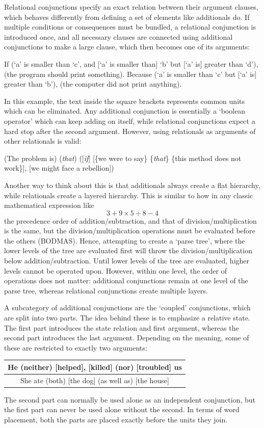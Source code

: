 Relational conjunctions specify an exact relation between their argument clauses, which behaves differently from defining a set of elements like additionals do. If multiple conditions or consequences must be bundled, a relational conjunction is introduced once, and all necessary clauses are connected using additional conjunctions to make a large clause, which then becomes one of its arguments:
\begin{example}
    If (`a' is smaller than `c', and [`a' is smaller than] `b' but [`a' is] greater than `d'), (the program should print something). Because (`a' is smaller than `c' but [`a' is] greater than `b'), (the computer did not print anything).
\end{example}
In this example, the text inside the square brackets represents common units which can be eliminated. Any additional conjunction is essentially a `boolean operator' which can keep adding on itself, while relational conjunctions expect a hard stop after the second argument. However, using relationals as arguments of other relationals is valid:
\begin{example}
    (The problem is) (\textit{that}) ([\textit{if}] [\{we were to say\} \{\textit{that}\} \{this method does not work\}], [we might face a rebellion])
\end{example}
Another way to think about this is that additionals always create a flat hierarchy, while relationals create a layered hierarchy. This is similar to how in any classic mathematical expression like
\begin{equation*}
    3+9\times5\div8-4
\end{equation*}
the precedence order of addition/subtraction, and that of division/multiplication is the same, but the division/multiplication operations must be evaluated before the others (BODMAS). Hence, attempting to create a `parse tree', where the lower levels of the tree are evaluated first will throw the division/multiplication below addition/subtraction. Until lower levels of the tree are evaluated, higher levels cannot be operated upon. However, within one level, the order of operations does not matter: additional conjunctions remain at one level of the parse tree, whereas relational conjunctions create multiple layers.

A subcategory of additional conjunctions are the `coupled' conjunctions, which are split into two parts. The idea behind these is to emphasize a relative state. The first part introduces the state relation and first argument, whereas the second part introduces the last argument. Depending on the meaning, some of these are restricted to exactly two arguments:
\begin{example}
    \begin{tabular}{c}
        He (neither) [helped], [killed] (nor) [troubled] us\\\hline She ate (both) [the dog] (as well as) [the house]
    \end{tabular}
\end{example}
The second part can normally be used alone as an independent conjunction, but the first part can never be used alone without the second. In terms of word placement, both the parts are placed exactly before the units they join.

